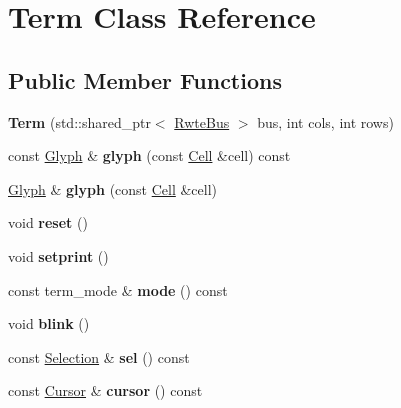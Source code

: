 \hypertarget{classTerm}{}\section{Term Class Reference}
\label{classTerm}
\subsection*{Public Member Functions}
\begin{DoxyCompactItemize}
\item 
\mbox{\label{classTerm_a41f3b6360a184495e4754d30dbbcb4d9}} 
{\bfseries Term} (std\+::shared\+\_\+ptr$<$ \mbox{\hyperlink{classBus}{Rwte\+Bus}} $>$ bus, int cols, int rows)
\item 
\mbox{\label{classTerm_a1229419f9abce59eb8bd3b7213906c8b}} 
const \mbox{\hyperlink{structGlyph}{Glyph}} \& {\bfseries glyph} (const \mbox{\hyperlink{structCell}{Cell}} \&cell) const
\item 
\mbox{\label{classTerm_a7d890f9a2c1dfaa66c0d9e1f9af87045}} 
\mbox{\hyperlink{structGlyph}{Glyph}} \& {\bfseries glyph} (const \mbox{\hyperlink{structCell}{Cell}} \&cell)
\item 
\mbox{\label{classTerm_aeeb1b49e6e8ffe5bc875b74f036f358f}} 
void {\bfseries reset} ()
\item 
\mbox{\label{classTerm_a51a180cb94fcb6bf086c40489f670bf0}} 
void {\bfseries setprint} ()
\item 
\mbox{\label{classTerm_aa87adbc8056d3fe03a75bc5867f6ed5a}} 
const term\+\_\+mode \& {\bfseries mode} () const
\item 
\mbox{\label{classTerm_a6ca60499c1f87c54e0d5b9c4b08d90ce}} 
void {\bfseries blink} ()
\item 
\mbox{\label{classTerm_accd571e2d476c376be7d01494da5ef64}} 
const \mbox{\hyperlink{classSelection}{Selection}} \& {\bfseries sel} () const
\item 
\mbox{\label{classTerm_a2cba1e04a285f9e5cb893c61a079b254}} 
const \mbox{\hyperlink{structCursor}{Cursor}} \& {\bfseries cursor} () const

\end{DoxyCompactItemize}
